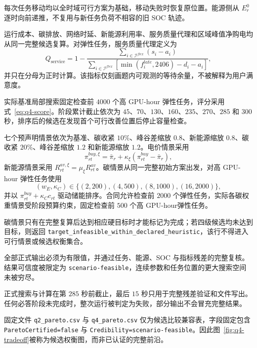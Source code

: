 每次任务移动均以全时域可行方案为基础，移动失败时恢复原位置。能源侧从 $E_r^0$ 逐时向前递推，不复用与新任务负荷不相容的旧 SOC 轨迹。

运行成本、碳排放、网络时延、新能源利用率、服务质量代理和区域峰值净购电均从同一完整候选复算。对弹性任务，服务质量代理定义为
\begin{equation}
Q_{\mathrm{service}}
=1-
\frac{\sum_{i\in\mathcal I^{flex}}(s_i-a_i)}
{\sum_{i\in\mathcal I^{flex}}
[\min(f_i^{late},2406)-d_i-a_i]},
\end{equation}
并只在分母为正时计算。该指标仅刻画题内可观测的等待余量，不被解释为用户满意度。

实际基准局部搜索固定检查前 $4000$ 个高 GPU-hour 弹性任务，评分采用式~\eqref{eq:q4-score}。阶段累计截止依次为 $45$、$70$、$130$、$160$、$235$、$270$、$285$ 和 $300$ 秒，排序后的候选在发现首个可行改善位置后停止容量检查。

七个预声明情景依次为基准、碳收紧 $10\%$、峰谷差缩放 $0.8$、新能源缩放 $0.8$、碳收紧 $20\%$、峰谷差缩放 $1.2$ 和新能源缩放 $1.2$。电价情景采用
\begin{equation}
\pi_{rt}^{buy,\xi}
=\bar\pi_r+\kappa_\xi(\pi_{rt}^{buy}-\bar\pi_r),
\end{equation}
新能源情景采用 $R_{rt}^{av,\xi}=\mu_\xi R_{rt}^{av}$。碳情景从同一完整初始方案出发，对高 GPU-hour 弹性任务使用
\begin{equation}
(w_E,\kappa_C)\in
\{(2,200),(4,500),(8,1000),(16,2000)\},
\end{equation}
并以 $\pi_{rt}^{buy}+\kappa_Cc_{rt}$ 驱动储能排序。合同允许检查前 $2000$ 个弹性任务，实际各碳权重情景受阶段预算约束，固定检查前 $500$ 个高 GPU-hour弹性任务。

碳情景只有在完整复算后达到相应硬目标时才能标记为完成；若四级候选均未达到目标，则返回 \texttt{target\_infeasible\_within\_declared\_heuristic}，该行不得进入可行情景或候选权衡集合。

全部正式输出必须为有限值，并通过任务、能源、SOC 与指标残差的完整复核。结果可信度被限定为 \texttt{scenario-feasible}，连续参数和任务位置的更大搜索空间未被穷尽。

正式搜索与计算在第 $285$ 秒前截止，最后 $15$ 秒只用于完整残差验证和文件写出。任何必答阶段未完成时，整次运行被判定为失败，部分输出不会冒充完整结果。

固定文件 \texttt{q2\_pareto.csv} 与 \texttt{q4\_pareto.csv} 仅为候选比较兼容表，字段固定包含 \texttt{ParetoCertified=false} 与 \texttt{Credibility=scenario-feasible}。因此图~\ref{fig:q4-tradeoff}被称为候选权衡图，而非已认证的完整前沿。

